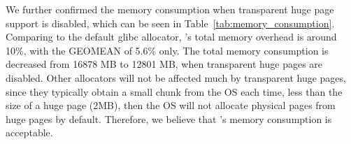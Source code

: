 We further confirmed the memory consumption when transparent huge page support is disabled, which can be seen in Table~\ref{tab:memory_consumption}. Comparing to the default glibc allocator, \NM{}'s total memory overhead is around 10\%, with the GEOMEAN of 5.6\% only. The total memory consumption is decreased from 16878 MB to 12801 MB,  when transparent huge pages are disabled. Other allocators will not be affected much by transparent huge pages, since they typically obtain a small chunk from the OS each time, less than the size of a huge page (2MB), then the OS will not allocate physical pages from huge pages by default.  
Therefore, we believe that \NM{}'s memory consumption is acceptable. 

 
 

 
